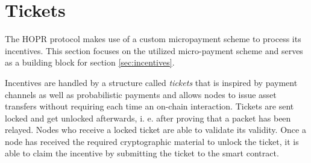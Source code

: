 \section{Tickets}
\label{sec:tickets}

The HOPR protocol makes use of a custom micropayment scheme to process its incentives. This section focuses on the utilized micro-payment scheme and serves as a building block for section \ref{sec:incentives}.

Incentives are handled by a structure called \textit{tickets} that is inspired by payment channels as well as probabilistic payments and allows nodes to issue asset transfers without requiring each time an on-chain interaction. Tickets are sent locked and get unlocked afterwards, i. e. after proving that a packet has been relayed. Nodes who receive a locked ticket are able to validate its validity. Once a node has received the required cryptographic material to unlock the ticket, it is able to claim the incentive by submitting the ticket to the smart contract.


